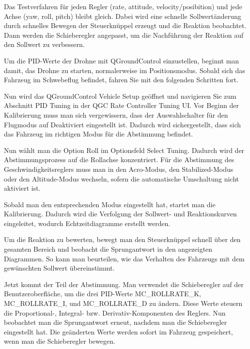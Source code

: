 Das Testverfahren für jeden Regler (rate, attitude, velocity/posibition) und jede Achse (yaw, roll, pitch) bleibt gleich. Dabei wird eine schnelle Sollwertänderung durch schnelles Bewegen der Steuerknüppel erzeugt und die Reaktion beobachtet. Dann werden die Schieberegler angepasst, um die Nachführung der Reaktion auf den Sollwert zu verbessern.

Um die PID-Werte der Drohne mit QGroundControl einzustellen, beginnt man damit, das Drohne zu starten, normalerweise im Positionsmodus. Sobald sich das Fahrzeug im Schwebeflug befindet, fahren Sie mit den folgenden Schritten fort.

Nun wird  das QGroundControl Vehicle Setup geöffnet und navigieren Sie zum Abschnitt PID Tuning in der QGC Rate Controller Tuning UI. Vor Beginn der Kalibrierung muss man sich vergewissern, dass der Auswahlschalter für den Flugmodus auf Deaktiviert eingestellt ist. Dadurch wird sichergestellt, dass sich das Fahrzeug im richtigen Modus für die Abstimmung befindet.

Nun wählt man die Option Roll im Optionsfeld Select Tuning. Dadurch wird der Abstimmungsprozess auf die Rollachse konzentriert.
Für die Abstimmung des Geschwindigkeitsreglers muss man in den Acro-Modus, den Stabilized-Modus oder den Altitude-Modus wechseln, sofern die automatische Umschaltung nicht aktiviert ist.

Sobald man den entsprechenden Modus eingestellt hat, startet man die Kalibrierung. Dadurch wird die Verfolgung der Sollwert- und Reaktionskurven eingeleitet, wodurch Echtzeitdiagramme erstellt werden.

Um die Reaktion zu bewerten, bewegt man den Steuerknüppel schnell über den gesamten Bereich und beobacht die Sprungantwort in den angezeigten Diagrammen. So kann man beurteilen, wie das Verhalten des Fahrzeugs mit dem gewünschten Sollwert übereinstimmt.

Jetzt kommt der Teil der Abstimmung. Man verwendet die Schieberegler auf der Benutzeroberfläche, um die drei PID-Werte MC\_ROLLRATE\_K, MC\_ROLLRATE\_I, und MC\_ROLLRATE\_D zu ändern. Diese Werte steuern die Proportional-, Integral- bzw. Derivativ-Komponenten des Reglers. Nun beobachtet man die Sprungantwort erneut, nachdem man die Schieberegler eingestellt hat. Die geänderten Werte werden sofort im Fahrzeug gespeichert, wenn man die Schieberegler bewegen.

